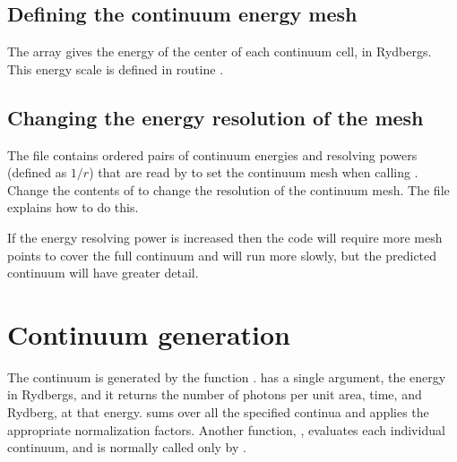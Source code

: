 \subsection{Defining the continuum energy mesh}

The array  gives the energy of the center of each
continuum cell, in Rydbergs.
This energy scale is defined in routine
.

\subsection{Changing the energy resolution of the mesh}

The file  contains ordered pairs
of continuum energies
and resolving powers (defined as $1/r$) that are read by 
to set the continuum
mesh when calling .
Change the contents of
 to change
the resolution of the continuum mesh.
The file explains how to do this.

If the energy resolving power is increased then the code will require more
mesh points to cover the full continuum and will run more slowly, but the
predicted continuum will have greater detail.

\section{Continuum generation}

The continuum is generated by the function .
 has a single argument,
the energy in Rydbergs, and it returns the number of photons per
unit area, time, and Rydberg, at that energy.
 sums over all the
specified continua and applies the appropriate normalization factors.
Another function, ,
evaluates each individual continuum, and is normally
called only by .

